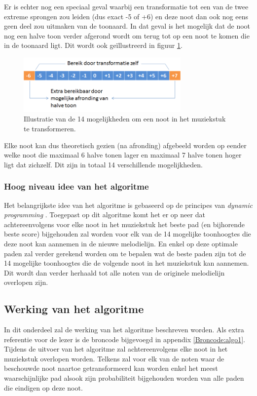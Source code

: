 Er is echter nog een speciaal geval waarbij een transformatie tot een van de twee extreme sprongen zou leiden (dus exact -5 of +6) en deze noot dan ook nog eens geen deel zou uitmaken van de toonaard. In dat geval is het mogelijk dat de noot nog een halve toon verder afgerond wordt om terug tot op een noot te komen die in de toonaard ligt. Dit wordt ook ge\"illustreerd in figuur \ref{figuur:14}.

\begin{figure}[!ht]
  \centering
  \includegraphics[width=0.75\textwidth]{4_Efficient_Toepassen_Transformatie/14}
  \caption{Illustratie van de 14 mogelijkheden om een noot in het muziekstuk te transformeren.}
  \label{figuur:14}
\end{figure}

Elke noot kan dus theoretisch gezien (na afronding) afgebeeld worden op eender welke noot die maximaal 6 halve tonen lager en maximaal 7 halve tonen hoger ligt dat zichzelf. Dit zijn in totaal 14 verschillende mogelijkheden.

\subsubsection{Hoog niveau idee van het algoritme}
Het belangrijkste idee van het algoritme is gebaseerd op de principes van \textit{dynamic programming} \cite{url:DP}. Toegepast op dit algoritme komt het er op neer dat achtereenvolgens voor elke noot in het muziekstuk het beste pad (en bijhorende beste score) bijgehouden zal worden voor elk van de 14 mogelijke toonhoogtes die deze noot kan aannemen in de nieuwe melodielijn. En enkel op deze optimale paden zal verder gerekend worden om te bepalen wat de beste paden zijn tot de 14 mogelijke toonhoogtes die de volgende noot in het muziekstuk kan aannemen. Dit wordt dan verder herhaald tot alle noten van de originele melodielijn overlopen zijn.

\subsection{Werking van het algoritme}
In dit onderdeel zal de werking van het algoritme beschreven worden. Als extra referentie voor de lezer is de broncode bijgevoegd in appendix \ref{Broncode:algo1}. Tijdens de uitvoer van het algoritme zal achtereenvolgens elke noot in het muziekstuk overlopen worden. Telkens zal voor elk van de noten waar de beschouwde noot naartoe getransformeerd kan worden enkel het meest waarschijnlijke pad alsook zijn probabiliteit bijgehouden worden van alle paden die eindigen op deze noot.


